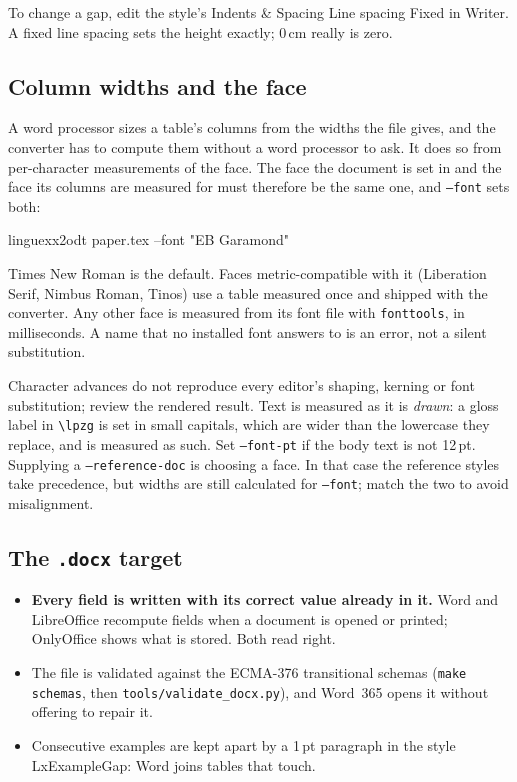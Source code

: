 \documentclass[11pt,a4paper]{article}
\newcommand{\cs}[1]{\texttt{\textbackslash #1}}
\newcommand{\opt}[1]{\texttt{#1}}
\newcommand{\file}[1]{\texttt{#1}}
\newcommand{\sty}[1]{\textsf{#1}}
\newcommand{\menu}[1]{\textsf{#1}}
\begin{document}
To change a gap, edit the style's \menu{Indents \& Spacing \textrightarrow{}
Line spacing \textrightarrow{} Fixed} in Writer. A fixed line spacing sets
the height exactly; 0\,cm really is zero.

\subsection{Column widths and the face}\label{sec:widths}

A word processor sizes a table's columns from the widths the file gives, and
the converter has to compute them without a word processor to ask. It does so
from per-character measurements of the face. The face the document is set
in and the face its columns are measured for must therefore be the same one,
and \opt{--font} sets both:
\begin{code}
linguexx2odt paper.tex --font "EB Garamond"
\end{code}
Times New Roman is the default. Faces metric-compatible with it (Liberation
Serif, Nimbus Roman, Tinos) use a table measured once and shipped with the
converter. Any other face is measured from its font file with
\texttt{fonttools}, in milliseconds. A name that no installed font answers
to is an error, not a silent substitution.

Character advances do not reproduce every editor’s shaping, kerning or
font substitution; review the rendered result.
Text is measured as it is \emph{drawn}: a gloss label in \cs{lpzg} is set in
small capitals, which are wider than the lowercase they replace, and is
measured as such. Set \opt{--font-pt} if the body text is not 12\,pt.
Supplying a \opt{--reference-doc} is choosing a face. In that case
the reference styles take precedence, but widths are still calculated for
\opt{--font}; match the two to avoid misalignment.

\subsection{The \file{.docx} target}

\begin{itemize}
\item \textbf{Every field is written with its correct value already in
  it.} Word and LibreOffice recompute fields when a document is opened or
  printed; OnlyOffice shows what is stored. Both read right.
\item The file is validated against the ECMA-376 transitional schemas
  (\texttt{make schemas}, then \file{tools/validate\_docx.py}), and Word~365
  opens it without offering to repair it.
\item Consecutive examples are kept apart by a 1\,pt paragraph in the style
  \sty{LxExampleGap}: Word joins tables that touch.
\end{itemize}
\end{document}
